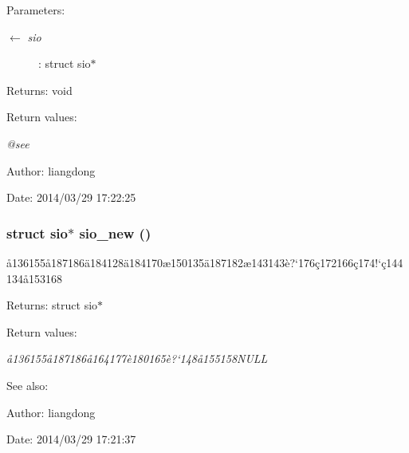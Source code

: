 \begin{Desc}
\item[Parameters:]
\begin{description}
\item[\mbox{$\leftarrow$} {\em sio}]: struct sio$\ast$ \end{description}
\end{Desc}
\begin{Desc}
\item[Returns:]void \end{Desc}
\begin{Desc}
\item[Return values:]
\begin{description}
\item[{\em @see}]\end{description}
\end{Desc}
\begin{Desc}
\item[Author:]liangdong \end{Desc}
\begin{Desc}
\item[Date:]2014/03/29 17:22:25 \end{Desc}
\subsubsection{\setlength{\rightskip}{0pt plus 5cm}struct sio$\ast$ sio\_\-new ()}\label{sio_8h_a4}


\aa{}136155\aa{}187186\"{a}184128\"{a}184170\ae{}150135\"{a}187182\ae{}143143\`{e}?`176\c{c}172166\c{c}174!`\c{c}144134\aa{}153168 

\begin{Desc}
\item[Returns:]struct sio$\ast$ \end{Desc}
\begin{Desc}
\item[Return values:]
\begin{description}
\item[{\em \aa{}136155\aa{}187186\aa{}164177\`{e}180165\`{e}?`148\aa{}155158NULL}]\end{description}
\end{Desc}
\begin{Desc}
\item[See also:]\end{Desc}
\begin{Desc}
\item[Author:]liangdong \end{Desc}
\begin{Desc}
\item[Date:]2014/03/29 17:21:37 \end{Desc}
